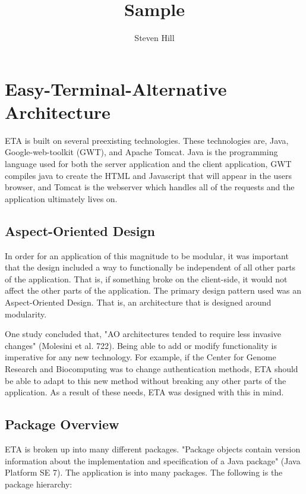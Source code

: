 \documentclass[12pt,a4paper]{article}
\author{Steven Hill}
\title{Sample}
\begin{document}
\section{Easy-Terminal-Alternative Architecture}
ETA is built on several preexisting technologies. These technologies are, Java, Google-web-toolkit (GWT), and Apache Tomcat. Java is the programming language used for both the server application and the client application, GWT compiles java  to create the HTML and Javascript that will appear in the users browser, and Tomcat is the webserver which handles all of the requests and the application ultimately lives on.

\subsection{Aspect-Oriented Design}
In order for an application of this magnitude to be modular, it was important that the design included a way to functionally be independent of all other parts of the application. That is, if something broke on the client-side, it would not affect the other parts of the application. The primary design pattern used was an Aspect-Oriented Design. That is, an architecture that is designed around modularity. 

One study concluded that, "AO architectures tended to require less invasive changes" (Molesini et al. 722). Being able to add or modify functionality is imperative for any new technology. For example, if the Center for Genome Research and Biocomputing was to change authentication methods, ETA should be able to adapt to this new method without breaking any other parts of the application. As a result of these needs, ETA was designed with this in mind.

\subsection{Package Overview}
ETA is broken up into many different packages. "Package objects contain version information about the implementation and specification of a Java package" (Java Platform SE 7). The application is into many packages. The following is the package hierarchy:
\end{document}
